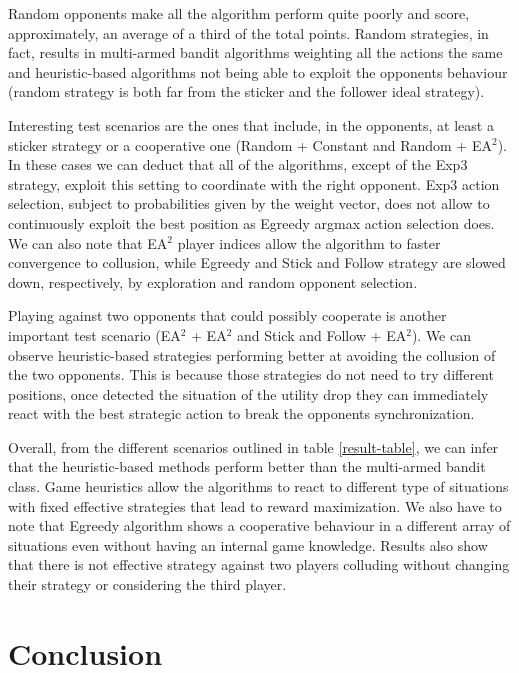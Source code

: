 \documentclass[runningheads]{llncs}
\begin{document}
Random opponents make all the algorithm perform quite
poorly and score, approximately, an average of a third of the total
points. Random strategies, in fact, results in multi-armed bandit
algorithms weighting all the actions the same and heuristic-based
algorithms not being able to exploit the opponents behaviour (random
strategy is both far from the sticker and the follower ideal strategy).

Interesting test scenarios are the ones that include, in the
opponents, at least a sticker strategy or a cooperative one (Random +
Constant and Random + EA$^2$). In these cases we can deduct that all
of the algorithms, except of the Exp3 strategy, exploit this setting
to coordinate with the right opponent. Exp3 action selection, subject
to probabilities given by the weight vector, does not allow to
continuously exploit the best position as Egreedy argmax action
selection does. We can also note that EA$^2$ player indices allow the
algorithm to faster convergence to collusion, while Egreedy and
Stick and Follow strategy are slowed down, respectively, by
exploration and random opponent selection.

Playing against two opponents that could possibly cooperate is another
important test scenario (EA$^2$ + EA$^2$ and Stick and Follow +
EA$^2$). We can observe heuristic-based strategies performing better
at avoiding the collusion of the two opponents. This is because those
strategies do not need to try different positions, once detected the
situation of the utility drop they can immediately react with the best
strategic action to break the opponents synchronization. 

Overall, from the different scenarios outlined in table
\ref{result-table}, we can infer that the heuristic-based methods
perform better than the multi-armed bandit class. Game heuristics
allow the algorithms to react to different type of situations with
fixed effective strategies that lead to reward maximization. We also
have to note that Egreedy algorithm shows a cooperative behaviour in a
different array of situations even without having an internal game
knowledge. Results also show that there is not effective strategy
against two players colluding without changing their strategy or
considering the third player.

\section{Conclusion}
\end{document}
